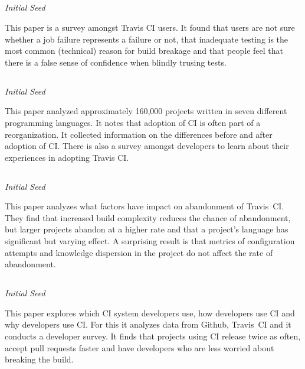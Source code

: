 \documentclass[]{book}
\begin{document}
\subsection{\texorpdfstring{\citet{pinto2018work}}{@pinto2018work}}\label{pinto2018work}

\emph{Initial Seed}

This paper is a survey amongst Travis CI users. It found that users are
not sure whether a job failure represents a failure or not, that
inadequate testing is the most common (technical) reason for build
breakage and that people feel that there is a false sense of confidence
when blindly trusing tests.

\subsection{\texorpdfstring{\citet{zhao2017impact}}{@zhao2017impact}}\label{zhao2017impact}

\emph{Initial Seed}

This paper analyzed approximately 160,000 projects written in seven
different programming languages. It notes that adoption of CI is often
part of a reorganization. It collected information on the differences
before and after adoption of CI. There is also a survey amongst
developers to learn about their experiences in adopting Travis CI.

\subsection{\texorpdfstring{\citet{widder2018m}}{@widder2018m}}\label{widder2018m}

\emph{Initial Seed}

This paper analyzes what factors have impact on abandonment of
Travis~CI. They find that increased build complexity reduces the chance
of abandonment, but larger projects abandon at a higher rate and that a
project's language has significant but varying effect. A surprising
result is that metrics of configuration attempts and knowledge
dispersion in the project do not affect the rate of abandonment.

\subsection{\texorpdfstring{\citet{hilton2016usage}}{@hilton2016usage}}\label{hilton2016usage}

\emph{Initial Seed}

This paper explores which CI system developers use, how developers use
CI and why developers use CI. For this it analyzes data from Github,
Travis~CI and it conducts a developer survey. It finds that projects
using CI release twice as often, accept pull requests faster and have
developers who are less worried about breaking the build.
\end{document}
